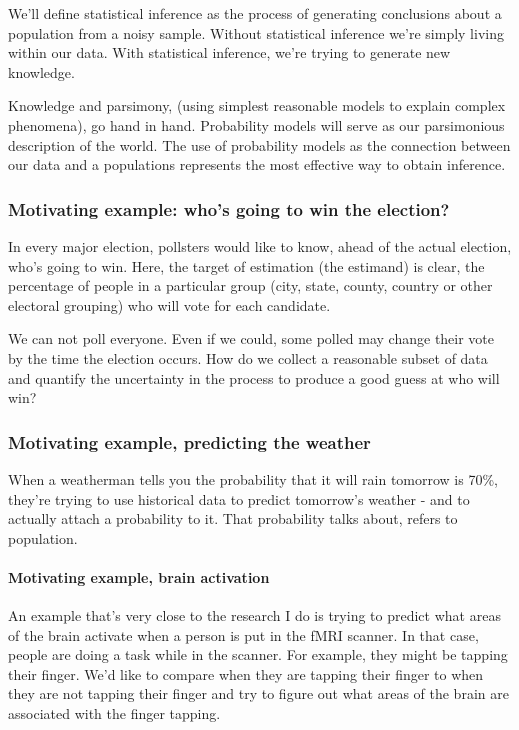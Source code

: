 \documentclass[]{article}
\begin{document}
We'll define statistical inference as the process of generating
conclusions about a population from a noisy sample. Without statistical
inference we're simply living within our data. With statistical
inference, we're trying to generate new knowledge.

Knowledge and parsimony, (using simplest reasonable models to explain
complex phenomena), go hand in hand. Probability models will serve as
our parsimonious description of the world. The use of probability models
as the connection between our data and a populations represents the most
effective way to obtain inference.

\subsubsection{Motivating example: who's going to win the
election?}\label{motivating-example-whos-going-to-win-the-election}

In every major election, pollsters would like to know, ahead of the
actual election, who's going to win. Here, the target of estimation (the
estimand) is clear, the percentage of people in a particular group
(city, state, county, country or other electoral grouping) who will vote
for each candidate.

We can not poll everyone. Even if we could, some polled may change their
vote by the time the election occurs. How do we collect a reasonable
subset of data and quantify the uncertainty in the process to produce a
good guess at who will win?

\subsubsection{Motivating example, predicting the
weather}\label{motivating-example-predicting-the-weather}

When a weatherman tells you the probability that it will rain tomorrow
is 70\%, they're trying to use historical data to predict tomorrow's
weather - and to actually attach a probability to it. That probability
talks about, refers to population.

\paragraph{Motivating example, brain
activation}\label{motivating-example-brain-activation}

An example that's very close to the research I do is trying to predict
what areas of the brain activate when a person is put in the fMRI
scanner. In that case, people are doing a task while in the scanner. For
example, they might be tapping their finger. We'd like to compare when
they are tapping their finger to when they are not tapping their finger
and try to figure out what areas of the brain are associated with the
finger tapping.
\end{document}
